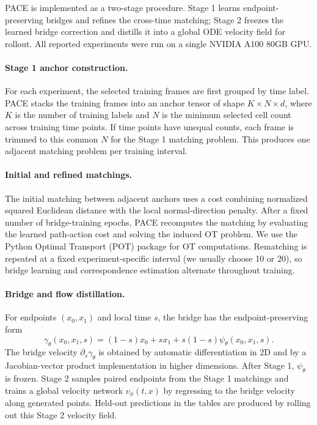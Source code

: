 PACE is implemented as a two-stage procedure. Stage 1 learns endpoint-preserving bridges and refines the cross-time matching; Stage 2 freezes the learned bridge correction and distills it into a global ODE velocity field for rollout.
All reported experiments were run on a single NVIDIA A100 80GB GPU.

\paragraph{Stage 1 anchor construction.}
For each experiment, the selected training frames are first grouped by time label. PACE stacks the training frames into an anchor tensor of shape $K\times N\times d$, where $K$ is the number of training labels and $N$ is the minimum selected cell count across training time points. If time points have unequal counts, each frame is trimmed to this common $N$ for the Stage 1 matching problem. This produces one adjacent matching problem per training interval.

\paragraph{Initial and refined matchings.}
The initial matching between adjacent anchors uses a cost combining normalized squared Euclidean distance with the local normal-direction penalty.
After a fixed number of bridge-training epochs, PACE recomputes the matching by evaluating the learned path-action cost and solving the induced OT problem.
We use the Python Optimal Transport (POT) package for OT computations.
Rematching is repeated at a fixed experiment-specific interval (we usually choose 10 or 20), so bridge learning and correspondence estimation alternate throughout training.

\paragraph{Bridge and flow distillation.}
For endpoints $(x_0,x_1)$ and local time $s$, the bridge has the endpoint-preserving form
\begin{equation}
  \gamma_\theta(x_0,x_1,s)
  =
  (1-s)x_0+s x_1+s(1-s)\psi_\theta(x_0,x_1,s).
\end{equation}
The bridge velocity $\partial_s\gamma_\theta$ is obtained by automatic differentiation in 2D and by a Jacobian-vector product implementation in higher dimensions. After Stage 1, $\psi_\theta$ is frozen. Stage 2 samples paired endpoints from the Stage 1 matchings and trains a global velocity network $v_\phi(t,x)$ by regressing to the bridge velocity along generated points. Held-out predictions in the tables are produced by rolling out this Stage 2 velocity field.

